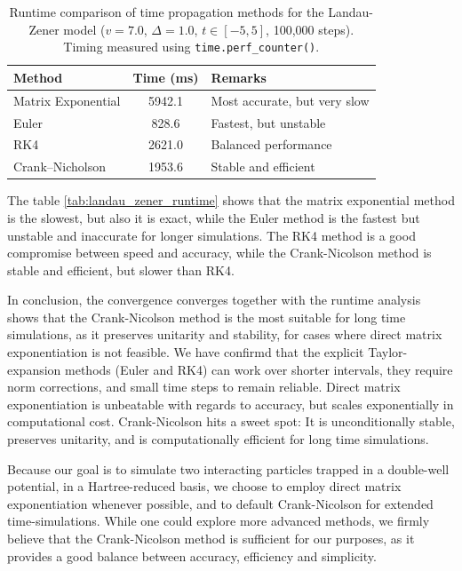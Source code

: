 \documentclass{subfiles}
\begin{document}
\begin{table}[h!]
\centering
\caption{Runtime comparison of time propagation methods for the Landau-Zener model ($v = 7.0$, $\Delta = 1.0$, $t \in [-5, 5]$, 100,000 steps). Timing measured using \texttt{time.perf\_counter()}.}
\begin{tabular}{l c l}
\toprule
\textbf{Method} & \textbf{Time (ms)} & \textbf{Remarks} \\
\midrule
Matrix Exponential & 5942.1 & Most accurate, but very slow \\
Euler              & 828.6  & Fastest, but unstable \\
RK4                & 2621.0 & Balanced performance \\
Crank--Nicholson   & 1953.6 & Stable and efficient \\
\bottomrule
\end{tabular}\label{tab:landau_zener_runtime}
\end{table}
The table \eqref{tab:landau_zener_runtime} shows that the matrix exponential method is the slowest, but also it is exact, while the Euler method is the fastest but unstable and inaccurate for longer simulations. The RK4 method is a good compromise between speed and accuracy, while the Crank-Nicolson method is stable and efficient, but slower than RK4. 

In conclusion, the convergence converges together with the runtime analysis shows that the Crank-Nicolson method is the most suitable for long time simulations, as it preserves unitarity and stability, for cases where direct matrix exponentiation is not feasible. We have confirmd that the explicit Taylor-expansion methods (Euler and RK4) can work over shorter intervals, they require norm corrections, and small time steps to remain reliable. Direct matrix exponentiation is unbeatable with regards to accuracy, but scales exponentially in computational cost. Crank-Nicolson hits a sweet spot: It is unconditionally stable, preserves unitarity, and is computationally efficient for long time simulations. 

Because our goal is to simulate two interacting particles trapped in a double-well potential, in a Hartree-reduced basis, we choose to employ direct matrix exponentiation whenever possible, and to default Crank-Nicolson for extended time-simulations. While one could explore more advanced methods, we firmly believe that the Crank-Nicolson method is sufficient for our purposes, as it provides a good balance between accuracy, efficiency and simplicity.
\end{document}
